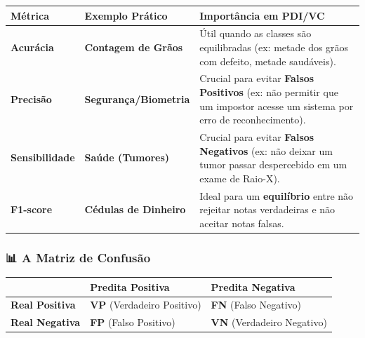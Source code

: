 \documentclass[
  portuguese,
  letterpaper,
  openany,
  oneside,
  12pt,
  a4paper]{book}
\begin{document}
\begin{longtable}[]{@{}
  >{\raggedright\arraybackslash}p{}
  >{\raggedright\arraybackslash}p{}
  >{\raggedright\arraybackslash}p{}@{}}
\toprule\noalign{}
\begin{minipage}[b]{\linewidth}\raggedright
Métrica
\end{minipage} & \begin{minipage}[b]{\linewidth}\raggedright
Exemplo Prático
\end{minipage} & \begin{minipage}[b]{\linewidth}\raggedright
Importância em PDI/VC
\end{minipage} \\
\midrule\noalign{}
\endhead
\bottomrule\noalign{}
\endlastfoot
\textbf{Acurácia} & \textbf{Contagem de Grãos} & Útil quando as classes
são equilibradas (ex: metade dos grãos com defeito, metade
saudáveis). \\
\textbf{Precisão} & \textbf{Segurança/Biometria} & Crucial para evitar
\textbf{Falsos Positivos} (ex: não permitir que um impostor acesse um
sistema por erro de reconhecimento). \\
\textbf{Sensibilidade} & \textbf{Saúde (Tumores)} & Crucial para evitar
\textbf{Falsos Negativos} (ex: não deixar um tumor passar despercebido
em um exame de Raio-X). \\
\textbf{F1-score} & \textbf{Cédulas de Dinheiro} & Ideal para um
\textbf{equilíbrio} entre não rejeitar notas verdadeiras e não aceitar
notas falsas. \\
\end{longtable}

\subsubsection{📊 A Matriz de Confusão}\label{a-matriz-de-confusuxe3o}

\begin{longtable}[]{@{}
  >{\raggedright\arraybackslash}p{}
  >{\raggedright\arraybackslash}p{}
  >{\raggedright\arraybackslash}p{}@{}}
\toprule\noalign{}
\begin{minipage}[b]{\linewidth}\raggedright
\end{minipage} & \begin{minipage}[b]{\linewidth}\raggedright
\textbf{Predita Positiva}
\end{minipage} & \begin{minipage}[b]{\linewidth}\raggedright
\textbf{Predita Negativa}
\end{minipage} \\
\midrule\noalign{}
\endhead
\bottomrule\noalign{}
\endlastfoot
\textbf{Real Positiva} & \textbf{VP} (Verdadeiro Positivo) & \textbf{FN}
(Falso Negativo) \\
\textbf{Real Negativa} & \textbf{FP} (Falso Positivo) & \textbf{VN}
(Verdadeiro Negativo) \\
\end{longtable}
\end{document}
